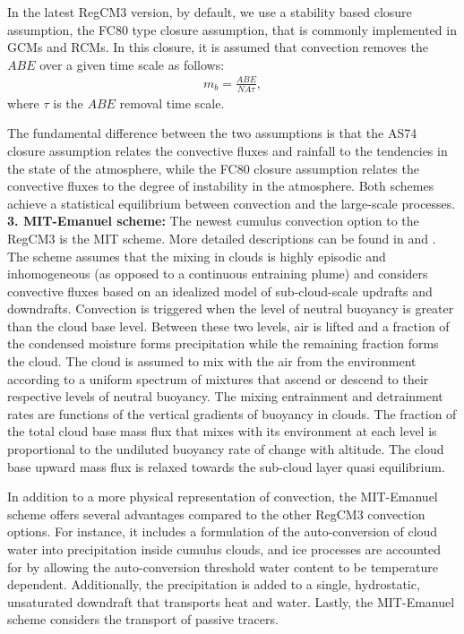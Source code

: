 In the latest RegCM3 version, by default, we use a stability based closure assumption, the FC80 type closure assumption, that is commonly
implemented in GCMs and RCMs. In this closure, it is assumed that convection removes the
$ABE$ over a given time scale as follows:
\begin{eqnarray}
m_b=\frac{ABE}{NA \tau},
\label{eqn_model:closureFC}
\end{eqnarray}
where $\tau$ is the $ABE$ removal time scale.

The fundamental difference between the two assumptions is that the
AS74 closure assumption relates the convective fluxes
and rainfall to the tendencies in the state of the atmosphere, while
the FC80 closure assumption relates the convective fluxes
to the degree of instability in the atmosphere. Both schemes achieve a
statistical equilibrium between convection and the large-scale processes.
\\


\noindent
{\bf 3. MIT-Emanuel scheme:}
The newest cumulus convection option to the \ac{RegCM3} is the
\ac{MIT} scheme. More detailed descriptions can be found in \citet{Emanuel_91} and
\citet{Emanuel_99}.  The scheme assumes that the mixing in clouds is
highly episodic and inhomogeneous (as opposed to a continuous
entraining plume) and considers convective fluxes based on an
idealized model of sub-cloud-scale updrafts and downdrafts.
Convection is triggered when the level of neutral buoyancy is greater
than the cloud base level.  Between these two levels, air is lifted
and a fraction of the condensed moisture forms precipitation while the
remaining fraction forms the cloud.  The cloud is assumed to mix with
the air from the environment according to a uniform spectrum of
mixtures that ascend or descend to their respective levels of neutral
buoyancy.  The mixing entrainment and detrainment rates are functions
of the vertical gradients of buoyancy in clouds.  The fraction of the
total cloud base mass flux that mixes with its environment at each
level is proportional to the undiluted buoyancy rate of change with
altitude.  The cloud base upward mass flux is relaxed towards the
sub-cloud layer quasi equilibrium.

In addition to a more physical representation of convection, the
MIT-Emanuel scheme offers several advantages compared to the
other RegCM3 convection options.  For instance, it includes a
formulation of the auto-conversion of cloud water into precipitation
inside cumulus clouds, and ice processes are accounted for by allowing
the auto-conversion threshold water content to be temperature
dependent.  Additionally, the precipitation is added to a single,
hydrostatic, unsaturated downdraft that transports heat and water.
Lastly, the MIT-Emanuel scheme considers the transport of passive tracers.

